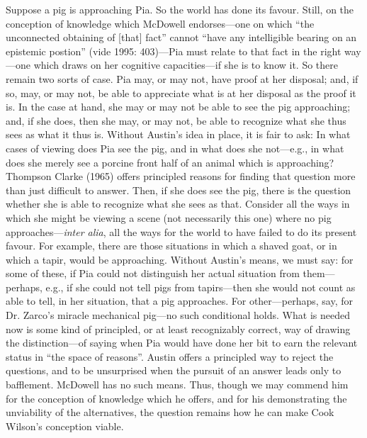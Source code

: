 Suppose a pig is approaching Pia. So the world has done its favour. Still, on the conception of knowledge which McDowell endorses---one on which ``the unconnected obtaining of [that] fact'' cannot ``have any intelligible bearing on an epistemic postion'' (vide 1995: 403)---Pia must relate to that fact in the right way---one which draws on her cognitive capacities---if she is to know it. So there remain two sorts of case. Pia may, or may not, have proof at her disposal; and, if so, may, or may not, be able to appreciate what is at her disposal as the proof it is. In the case at hand, she may or may not be able to see the pig approaching; and, if she does, then she may, or may not, be able to recognize what she thus sees as what it thus is. Without Austin's idea in place, it is fair to ask: In what cases of viewing does Pia see the pig, and in what does she not---e.g., in what does she merely see a porcine front half of an animal which is approaching? Thompson Clarke (1965) offers principled reasons for finding that question more than just difficult to answer. Then, if she does see the pig, there is the question whether she is able to recognize what she sees as that. Consider all the ways in which she might be viewing a scene (not necessarily this one) where no pig approaches---\emph{inter alia}, all the ways for the world to have failed to do its present favour. For example, there are those situations in which a shaved goat, or in which a tapir, would be approaching. Without Austin's means, we must say: for some of these, if Pia could not distinguish her actual situation from them---perhaps, e.g., if she could not tell pigs from tapirs---then she would not count as able to tell, in her situation, that a pig approaches. For other---perhaps, say, for Dr. Zarco’s miracle mechanical pig---no such conditional holds. What is needed now is some kind of principled, or at least recognizably correct, way of drawing the distinction---of saying when Pia would have done her bit to earn the relevant status in ``the space of reasons''. Austin offers a principled way to reject the questions, and to be unsurprised when the pursuit of an answer leads only to bafflement. McDowell has no such means. Thus, though we may commend him for the conception of knowledge which he offers, and for his demonstrating the unviability of the alternatives, the question remains how he can make Cook Wilson’s conception viable.

